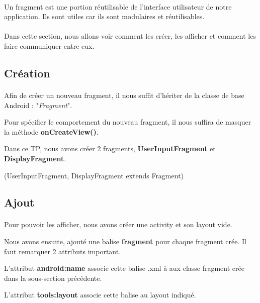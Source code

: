 \documentclass[a4paper]{article}
\begin{document}
\begin{multicols}{2}
            \paragraph{}
                Un fragment est une portion réutilisable de l'interface utilisateur de notre application. Ils sont utiles car ils sont modulaires et réutilisables. 
            \paragraph{}
                Dans cette section, nous allons voir comment les créer, les afficher et comment les faire communiquer entre eux.
            \subsection{Création}
                \paragraph{}
                    Afin de créer un nouveau fragment, il nous suffit d'hériter de la classe de base Android : "\emph{Fragment}".

                    Pour spécifier le comportement du nouveau fragment, il nous suffira de masquer la méthode \textbf{onCreateView()}.

                    Dans ce TP, nous avons créer 2 fragments, \textbf{UserInputFragment} et \textbf{DisplayFragment}.

                    (UserInputFragment, DisplayFragment extends Fragment)
            \subsection{Ajout}
                \paragraph{}
                    Pour pouvoir les afficher, nous avons créer une activity et son layout vide.
                    
                    Nous avons ensuite, ajouté une balise \textbf{fragment} pour chaque fragment crée. Il faut remarquer 2 attributs important.

                    L'attribut \textbf{android:name} associe cette balise .xml à aux classe fragment crée dans la sous-section précédente.

                    L'attribut \textbf{tools:layout} associe cette balise au layout indiqué.


\end{multicols}
\end{document}
